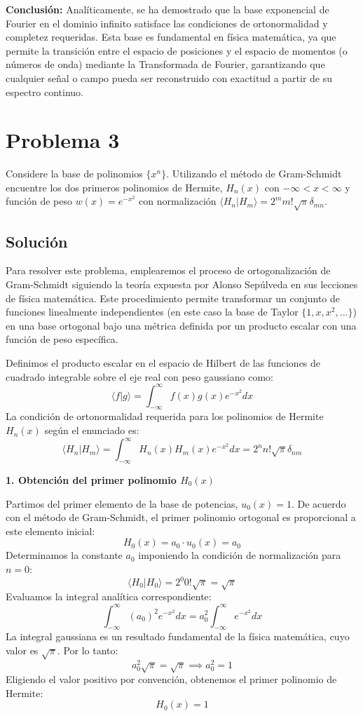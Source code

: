 \documentclass[a4paper]{article}
\begin{document}
\textbf{Conclusión:} Analíticamente, se ha demostrado que la base exponencial de Fourier en el dominio infinito satisface las condiciones de ortonormalidad y completez requeridas. Esta base es fundamental en física matemática, ya que permite la transición entre el espacio de posiciones y el espacio de momentos (o números de onda) mediante la Transformada de Fourier, garantizando que cualquier señal o campo pueda ser reconstruido con exactitud a partir de su espectro continuo.


\section{Problema 3}
Considere la base de polinomios $\{x^n\}.$ Utilizando el método de Gram-Schmidt encuentre los dos primeros polinomios de Hermite, $H_n(x)$ con $-\infty < x < \infty$ y función de peso $w(x) = e^{-x^2}$ con normalización $\langle H_n|H_m\rangle = 2^m m! \sqrt{\pi} \delta_{mn}.$

\subsection{Solución}

Para resolver este problema, emplearemos el proceso de ortogonalización de Gram-Schmidt siguiendo la teoría expuesta por Alonso Sepúlveda en sus lecciones de física matemática. Este procedimiento permite transformar un conjunto de funciones linealmente independientes (en este caso la base de Taylor $\{1, x, x^2, ...\}$) en una base ortogonal bajo una métrica definida por un producto escalar con una función de peso específica.

Definimos el producto escalar en el espacio de Hilbert de las funciones de cuadrado integrable sobre el eje real con peso gaussiano como:
$$ \langle f | g \rangle = \int_{-\infty}^{\infty} f(x)g(x)e^{-x^2} dx $$
La condición de ortonormalidad requerida para los polinomios de Hermite $H_n(x)$ según el enunciado es:
$$ \langle H_n | H_m \rangle = \int_{-\infty}^{\infty} H_n(x)H_m(x)e^{-x^2} dx = 2^n n! \sqrt{\pi} \delta_{nm} $$

\textbf{1. Obtención del primer polinomio $H_0(x)$}

Partimos del primer elemento de la base de potencias, $u_0(x) = 1.$ De acuerdo con el método de Gram-Schmidt, el primer polinomio ortogonal es proporcional a este elemento inicial:
$$ H_0(x) = a_0 \cdot u_0(x) = a_0 $$
Determinamos la constante $a_0$ imponiendo la condición de normalización para $n=0$:
$$ \langle H_0 | H_0 \rangle = 2^0 0! \sqrt{\pi} = \sqrt{\pi} $$
Evaluamos la integral analítica correspondiente:
$$ \int_{-\infty}^{\infty} (a_0)^2 e^{-x^2} dx = a_0^2 \int_{-\infty}^{\infty} e^{-x^2} dx $$
La integral gaussiana es un resultado fundamental de la física matemática, cuyo valor es $\sqrt{\pi}.$ Por lo tanto:
$$ a_0^2 \sqrt{\pi} = \sqrt{\pi} \implies a_0^2 = 1 $$
Eligiendo el valor positivo por convención, obtenemos el primer polinomio de Hermite:
$$ H_0(x) = 1 $$
\end{document}
